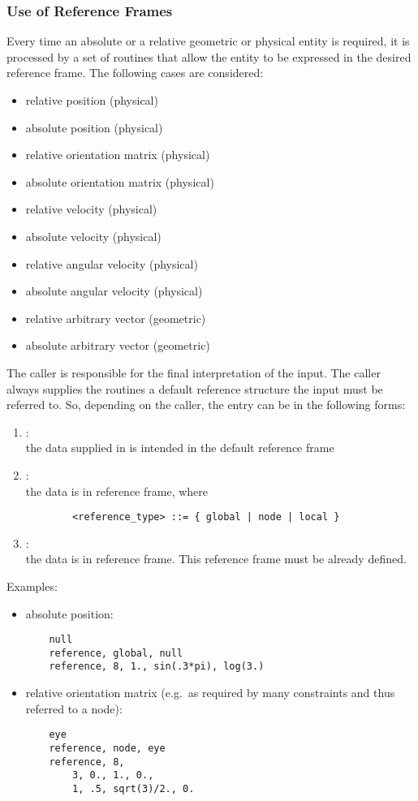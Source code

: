 \subsubsection{Use of Reference Frames}
Every time an absolute or a relative geometric or physical entity is
required, it is processed by a set of routines that allow the entity to be
expressed in the desired reference frame.
The following cases are considered:
\begin{itemize}
    \item relative position (physical)
    \item absolute position (physical)
    \item relative orientation matrix (physical)
    \item absolute orientation matrix (physical)
    \item relative velocity (physical)
    \item absolute velocity (physical)
    \item relative angular velocity (physical)
    \item absolute angular velocity (physical)
    \item relative arbitrary vector (geometric)
    \item absolute arbitrary vector (geometric)    
\end{itemize}
The caller is responsible for the final interpretation of the input. 
The caller always supplies the routines a default reference structure
the input must be referred to.
So, depending on the caller, the entry can be in the following forms:
\begin{enumerate}
\item {}: \\ 
	the data supplied in  is intended 
	in the default reference frame
\item {}: \\
	the data is in  reference frame, where
\begin{verbatim}
        <reference_type> ::= { global | node | local }
\end{verbatim}
\item {}: \\
	the data is in  reference frame. 
	This reference frame must be already defined. 
\end{enumerate}
Examples:
\begin{itemize}
    \item absolute position:
    \begin{verbatim}
    null
    reference, global, null
    reference, 8, 1., sin(.3*pi), log(3.)
    \end{verbatim}
    \item relative orientation matrix (e.g.\ as required by many constraints and
    thus referred to a node):
    \begin{verbatim}
    eye
    reference, node, eye
    reference, 8,
        3, 0., 1., 0., 
        1, .5, sqrt(3)/2., 0.
    \end{verbatim}
\end{itemize}
